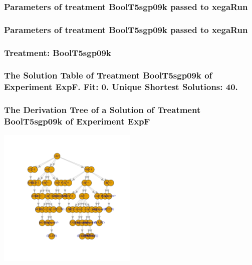 \documentclass[18pt,c]{beamer}
\begin{document}

 \begin{frame}
 \fontsize{8pt}{9pt}\selectfont
 \frametitle{  Parameters of treatment BoolT5sgp09k passed to xegaRun
 }

 \label{ExpFtParmTable030.tex}  
 \end{frame}


 \begin{frame}
 \fontsize{8pt}{9pt}\selectfont
 \frametitle{  Parameters of treatment BoolT5sgp09k passed to xegaRun
 }

 \label{ExpFtParmTable031.tex}  
 \end{frame}

 \begin{frame}
 \fontsize{8pt}{9pt}\selectfont
 \frametitle{ Treatment: BoolT5sgp09k }

 \label{ExpFStatsTable013.tex}  
 \end{frame}

 \begin{frame}
 \fontsize{8pt}{9pt}\selectfont
 \frametitle{ The Solution Table of Treatment BoolT5sgp09k of Experiment ExpF. Fit: 0. Unique Shortest Solutions: 40. }

 \label{ExpFSolutionTable007.tex}  
 \end{frame}

 \begin{frame}
 \frametitle{ The Derivation Tree of a Solution of Treatment BoolT5sgp09k of Experiment ExpF }
 \begin{center}
\includegraphics[width=0.5\textwidth, angle=0]
{ExpFDerivationTreeFigure007.pdf}
 \end{center}
 \label{report/ExpFDerivationTreeFigure007.pdf}  
 \end{frame}
\end{document}
